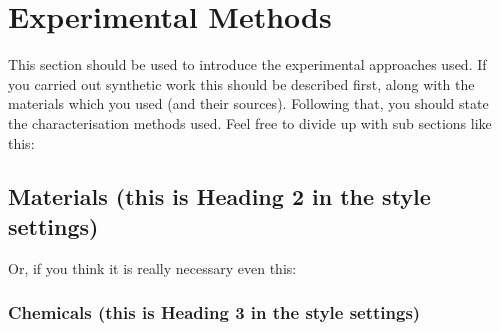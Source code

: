 \section{Experimental Methods}
This section should be used to introduce the experimental approaches used. If you carried out synthetic work this should be described first, along with the materials which you used (and their sources). Following that, you should state the characterisation methods used. Feel free to divide up with sub sections like this:
\subsection{Materials (this is Heading 2 in the style settings)}
Or, if you think it is really necessary even this:
\subsubsection{Chemicals (this is Heading 3 in the style settings)}